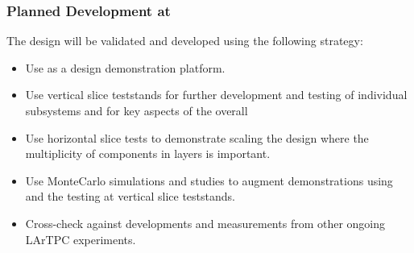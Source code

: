 





\subsubsection{Planned Development at }
\label{sec:sp-daq:design-validation}

The    design will be validated and developed using the following strategy:
\begin{itemize}
\item Use  as a design demonstration platform. 
\item Use vertical slice teststands for further development and testing of
  individual  subsystems and for key aspects of the
  overall 
\item Use horizontal slice tests to demonstrate scaling the design where the multiplicity of components in layers is important.
\item Use  MonteCarlo simulations and studies to augment
  demonstrations using  and the testing at vertical slice teststands.
\item Cross-check against developments and measurements from other ongoing
  LArTPC experiments.
\end{itemize}

